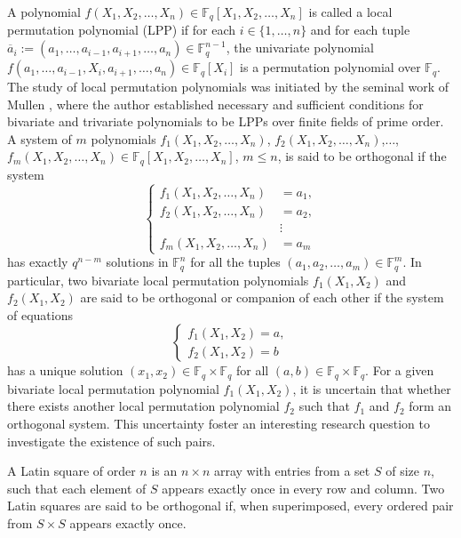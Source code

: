 \documentclass[11pt]{amsart}
\theoremstyle{plain}
\numberwithin{equation}{section}
\def\F{{\mathbb F}}
\begin{document}
A polynomial $f(X_1,X_2,\ldots,X_n) \in \F_q[X_1,X_2,\ldots,X_n]$ is called a local permutation polynomial (LPP) if for each $ i \in \{1, \ldots, n\}$ and for each tuple $\overline{a}_i:=(a_1,\ldots,a_{i-1},a_{i+1},\ldots,a_n)\in \F_q^{n-1}$, the univariate polynomial $f(a_1,\ldots,a_{i-1},X_i,a_{i+1},\ldots,a_n)\in \F_q[X_i]$ is a permutation polynomial over $\F_q$. The study of local permutation polynomials was initiated by the seminal work of Mullen \cite{Mullen_1980,Mullen_1_1980}, where the author established necessary and sufficient conditions for bivariate and trivariate polynomials to be LPPs over finite fields of prime order. A system of $m$ polynomials $f_1(X_1,X_2,\ldots,X_n)$, $f_2(X_1,X_2,\ldots,X_n)$,$\ldots$, $f_m(X_1,X_2,\ldots,X_n) \in \F_q[X_1,X_2,\ldots,X_n]$, $m \leq n$, is said to be orthogonal  if the system 
\begin{equation*}
\left\{
\begin{aligned}
f_1(X_1,X_2,\ldots,X_n) &= a_1,\\
f_2(X_1,X_2,\ldots,X_n) &= a_2,\\
 &\vdots \\
f_m(X_1,X_2,\ldots,X_n) &= a_m
\end{aligned}
\right.
\end{equation*}
has exactly $q^{n-m}$ solutions in $\F_q^{n}$ for all the tuples $(a_1,a_2,\ldots,a_m) \in \F_q^{m}$. In particular, two bivariate local permutation polynomials $f_1(X_1,X_2)$ and $f_2(X_1,X_2)$ are said to be orthogonal or companion of each other if the system of equations 
\begin{equation*}
\begin{cases}
f_1(X_1,X_2)=a,\\
 f_2(X_1,X_2)=b
\end{cases}
\end{equation*}
has a unique solution $(x_1,x_2) \in \F_q \times \F_q$ for all $ (a,b) \in \F_q \times \F_q$. For a given bivariate local permutation polynomial $f_1(X_1,X_2)$, it is uncertain that whether there exists another local permutation polynomial $f_2$ such that $f_1$ and $f_2$ form an orthogonal system. This uncertainty foster an interesting research question to investigate the existence of such pairs. 

 A Latin square of order  $n$ is an $ n \times n $ array with entries from a set $S$ of size $n$, such that each element of $S$ appears exactly once in every row and column. Two Latin squares are said to be orthogonal if, when superimposed, every ordered pair from $S\times S$ appears exactly once.
\end{document}
